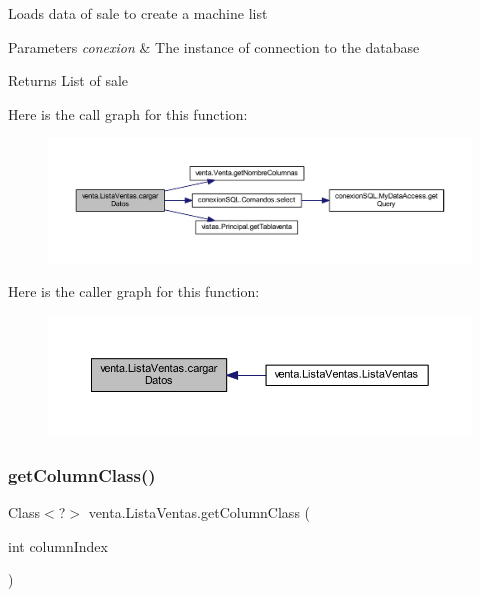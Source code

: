 Loads data of sale to create a machine list 
\begin{DoxyParams}{Parameters}
{\em conexion} & The instance of connection to the database \\
\hline
\end{DoxyParams}
\begin{DoxyReturn}{Returns}
List of sale 
\end{DoxyReturn}
Here is the call graph for this function\+:
\nopagebreak
\begin{figure}[H]
\begin{center}
\leavevmode
\includegraphics[width=350pt]{classventa_1_1_lista_ventas_a5addbb3cc5ae30ddd938cc5ae3021a48_cgraph}
\end{center}
\end{figure}
Here is the caller graph for this function\+:
\nopagebreak
\begin{figure}[H]
\begin{center}
\leavevmode
\includegraphics[width=350pt]{classventa_1_1_lista_ventas_a5addbb3cc5ae30ddd938cc5ae3021a48_icgraph}
\end{center}
\end{figure}
\mbox{\label{classventa_1_1_lista_ventas_a285fad7c683f620c9320ee9d430975bd}} 
\subsubsection{\texorpdfstring{get\+Column\+Class()}{getColumnClass()}}
{\footnotesize\ttfamily Class$<$?$>$ venta.\+Lista\+Ventas.\+get\+Column\+Class (\begin{DoxyParamCaption}\item[{int}]{column\+Index }\end{DoxyParamCaption})}

